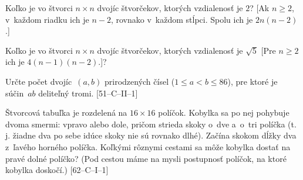 {

Koľko je vo štvorci $n\times n$ dvojíc štvorčekov, ktorých vzdialenosť je $2$?
[Ak $n\ge2$, v~každom riadku ich je $n-2$, rovnako v~každom stĺpci. Spolu ich je $2n(n-2)$.]

Koľko je vo štvorci $n\times n$ dvojíc štvorčekov, ktorých vzdialenosť je $\sqrt5$ [Pre $n\ge2$ ich je $4(n-1)(n-2)$.]?

\D
Určte počet dvojíc~$(a,b)$ prirodzených čísel ($1\le a<b\le86$), pre ktoré je súčin~$ab$ deliteľný tromi.
[51--C--II--1]

Štvorcová tabuľka je rozdelená na $16\times16$ políčok. Kobylka sa po nej
pohybuje dvoma smermi: vpravo alebo dole, pričom
strieda skoky o~dve a~o~tri políčka (t.\,j. žiadne dva po sebe idúce
skoky nie sú rovnako dlhé). Začína skokom dĺžky dva
z~ľavého horného políčka. Koľkými rôznymi cestami sa môže
kobylka dostať na pravé dolné políčko? (Pod cestou máme na mysli
postupnosť políčok, na ktoré kobylka doskočí.) [62--C--I--1]

}

